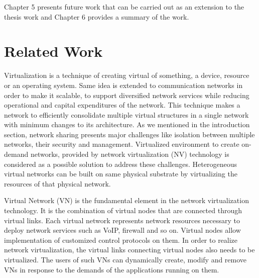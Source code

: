 \documentclass[article,dr=phil,type=msc ,colorback,accentcolor=tud4b]{tudthesis}
\begin{document}
Chapter 5 presents future work that can be carried out as an extension to the thesis work and Chapter 6 provides a summary of the work. 

 \newpage


\section{Related Work}

Virtualization is a technique of creating virtual of something, a device, resource or an operating system. Same idea is extended to communication networks in order to make it scalable, to support diversified network services while reducing operational and capital expenditures of the network. This technique makes a network to efficiently consolidate multiple virtual structures in a single network with minimum changes to its architecture. As we mentioned in the introduction section, network sharing presents major challenges like isolation between multiple networks, their security and management. Virtualized environment to create on-demand networks, provided by network virtualization (NV) technology is considered as a possible solution to address these challenges. Heterogeneous virtual networks can be built on same physical substrate by virtualizing the resources of that physical network.  \newline

Virtual Network (VN) is the fundamental element in the network virtualization \cite{nw_virt} technology. It is the combination of virtual nodes that are connected through virtual links. Each virtual network represents network resources necessary to deploy network services such as VoIP, firewall and so on. Virtual nodes allow implementation of customized control protocols on them. In order to realize network virtualization, the virtual links connecting virtual nodes also needs to be virtualized. The users of such VNs can dynamically create, modify and remove VNs in response to the demands of the applications running on them. \newline
\end{document}
